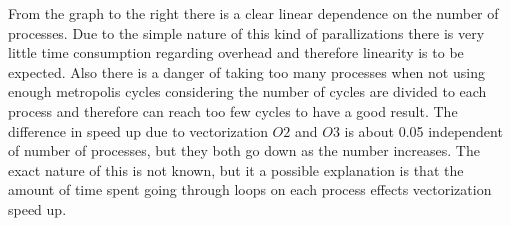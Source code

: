From the graph to the right there is a clear linear dependence on the number of 
processes. Due to the simple nature of this kind of parallizations there is very
little time consumption regarding overhead and therefore linearity is to be expected.
Also there is a danger of taking too many processes when not using enough metropolis
cycles considering the number of cycles are divided to each process and therefore 
can reach too few cycles to have a good result.
The difference in speed up due to vectorization $O2$ and $O3$ is about 0.05 independent 
of number of processes, but they both go down as the number increases. The exact nature
of this is not known, but it a possible explanation is that the amount of
time spent going through loops on each process effects vectorization speed up.
%
